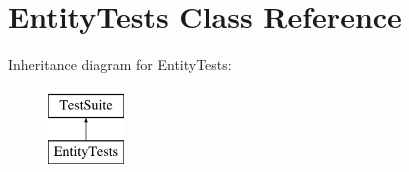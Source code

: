 \hypertarget{classEntityTests}{\section{Entity\-Tests Class Reference}
\label{classEntityTests}
}
Inheritance diagram for Entity\-Tests\-:\begin{figure}[H]
\begin{center}
\leavevmode
\includegraphics[height=2.000000cm]{classEntityTests}
\end{center}
\end{figure}
